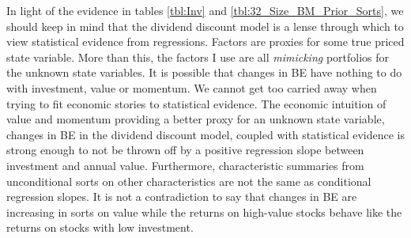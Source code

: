 In light of the evidence in tables \ref{tbl:Inv} and \ref{tbl:32_Size_BM_Prior_Sorts}, we
should keep in mind that the dividend discount model is a lense through which to view
statistical evidence from regressions. Factors are proxies for some true priced state
variable. More than this, the factors I use are all \emph{mimicking} portfolios for the
unknown state variables. It is possible that changes in BE have nothing to do with
investment, value or momentum. We cannot get too carried away when trying to fit economic
stories to statistical evidence. The economic intuition of value and momentum providing a
better proxy for an unknown state variable, changes in BE in the dividend discount model,
coupled with statistical evidence is strong enough to not be thrown off by a positive
regression slope between investment and annual value. Furthermore, characteristic
summaries from unconditional sorts on other characteristics are not the same as
conditional regression slopes. It is not a contradiction to say that changes in BE are
increasing in sorts on value while the returns on high-value stocks behave like the
returns on stocks with low investment.
